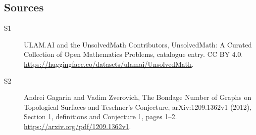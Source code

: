 \documentclass[11pt]{article}
\begin{document}
\subsection{Sources}
\begin{description}
\item[\hypertarget{source:statement:1}{S1}] ULAM.AI and the UnsolvedMath Contributors, UnsolvedMath: A Curated Collection of Open Mathematics Problems, catalogue entry. CC BY 4.0. \url{https://huggingface.co/datasets/ulamai/UnsolvedMath}.
\item[\hypertarget{source:statement:2}{S2}] Andrei Gagarin and Vadim Zverovich, The Bondage Number of Graphs on Topological Surfaces and Teschner’s Conjecture, arXiv:1209.1362v1 (2012), Section 1, definitions and Conjecture 1, pages 1--2. \url{https://arxiv.org/pdf/1209.1362v1}.
\end{description}
\label{end:statement}
\end{document}
